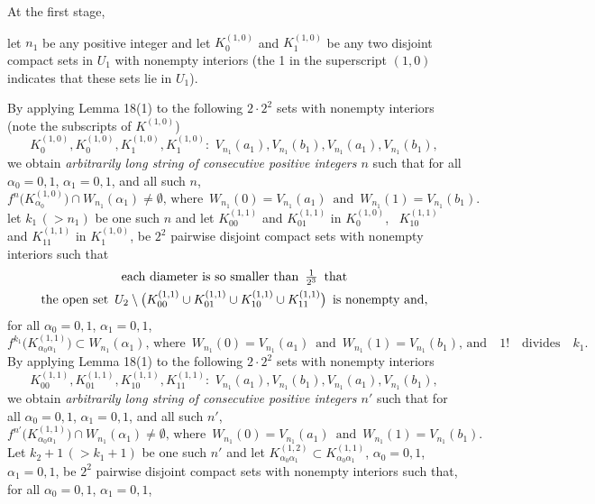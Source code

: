 \documentclass[12pt]{article}
\newcommand{\al}{\alpha}
\begin{document}
At the first stage, 

let $n_1$ be any positive integer and let $K_0^{(1,0)}$ and $K_1^{(1,0)}$ be any two disjoint compact sets in $U_1$ with nonempty interiors \big(the 1 in the superscript $(1,0)$ indicates that these sets lie in $U_1$\big).

By applying Lemma 18(1) to the following $2 \cdot 2^2$ sets with nonempty interiors \big(note the subscripts of $K^{(1,0)}$\big)
$$
K_0^{(1,0)}, K_0^{(1,0)}, K_1^{(1,0)}, K_1^{(1,0)}: \,\, V_{n_1}(a_1), V_{n_1}(b_1), V_{n_1}(a_1), V_{n_1}(b_1),
$$ 
we obtain {\it arbitrarily long string of consecutive positive integers $n$} such that
for all $\al_0 = 0, 1$, $\al_1 = 0, 1$, and all such $n$, 
$$
f^n\big(K_{\al_0}^{(1,0)}\big) \cap W_{n_1}(\al_1) \ne \emptyset, \, \text{where} \,\,\, W_{n_1}(0) = V_{n_1}(a_1) \,\,\, \text{and} \,\,\, W_{n_1}(1) = V_{n_1}(b_1).
$$
let $k_1 \, (> n_1)$ be one such $n$ and let $K_{00}^{(1,1)}$ and $K_{01}^{(1,1)}$ in $K_{0}^{(1,0)}$, \, $K_{10}^{(1,1)}$ and $K_{11}^{(1,1)}$ in $K_{1}^{(1,0)}$, be $2^2$ pairwise disjoint compact sets with nonempty interiors such that  
\begin{multline*}
$$
\text{each diameter is so smaller than} \,\,\, \frac 1{2^3} \,\,\, \text{that} \\ 
\text{the open set} \,\,\, 
U_2 \setminus \big(K_{00}^{(1,1)} \cup K_{01}^{(1,1)} \cup K_{10}^{(1,1)} \cup K_{11}^{(1,1)}\big) \,\,\, \text{is nonempty and},
$$
\end{multline*}
for all $\al_0 = 0, 1$, $\al_1 = 0, 1$, 
$$
f^{k_1}\big(K_{\al_0\al_1}^{(1,1)}\big) \subset W_{n_1}(\al_1), \, \text{where} \,\,\, W_{n_1}(0) = V_{n_1}(a_1) \,\,\, \text{and} \,\,\, W_{n_1}(1) = V_{n_1}(b_1), \, \text{and} \quad 1! \quad \text{divides} \quad k_1.%
$$
\indent By applying Lemma 18(1) to the following $2 \cdot 2^2$ sets with nonempty interiors  
$$
K_{00}^{(1,1)}, K_{01}^{(1,1)}, K_{10}^{(1,1)}, K_{11}^{(1,1)}: \,\, V_{n_1}(a_1), V_{n_1}(b_1), V_{n_1}(a_1), V_{n_1}(b_1),
$$ 
we obtain {\it arbitrarily long string of consecutive positive integers $n'$} such that
for all $\al_0 = 0, 1$, $\al_1 = 0, 1$, and all such $n'$, 
$$
f^{n'}\big(K_{\al_0\al_1}^{(1,1)}\big) \cap W_{n_1}(\al_1) \ne \emptyset, \, \text{where} \,\,\, W_{n_1}(0) = V_{n_1}(a_1) \,\,\, \text{and} \,\,\, W_{n_1}(1) = V_{n_1}(b_1).
$$
\indent Let $k_2 +1 \, (> k_1+1)$ be one such $n'$ and let $K_{\al_0\al_1}^{(1,2)} \subset K_{\al_0\al_1}^{(1,1)}$, $\al_0 = 0, 1$, $\al_1 = 0, 1$, be $2^2$ pairwise disjoint compact sets with nonempty interiors such that, for all $\al_0 = 0, 1$, $\al_1 = 0, 1$, 
\end{document}
